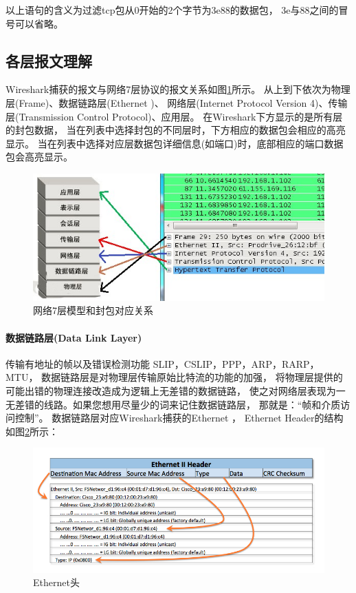 \documentclass{book}
\begin{document}
以上语句的含义为过滤tcp包从0开始的2个字节为3e88的数据包，
3e与88之间的冒号可以省略。

\subsection{各层报文理解}


Wireshark捕获的报文与网络7层协议的报文关系如图\ref{fig:SevenModelInWireshark}所示。
从上到下依次为物理层(Frame)、数据链路层(Ethernet \uppercase\expandafter{})、
网络层(Internet Protocol Version 4)、传输层(Transmission Control Protocol)、应用层。
在Wireshark下方显示的是所有层的封包数据，
当在列表中选择封包的不同层时，下方相应的数据包会相应的高亮显示。
当在列表中选择对应层数据包详细信息(如端口)时，底部相应的端口数据包会高亮显示。

\begin{figure}[htbp]
	\centering
	\includegraphics[scale=0.6]{SevenModelInWireshark.jpg}
	\caption{网络7层模型和封包对应关系}
	\label{fig:SevenModelInWireshark}
\end{figure}

\paragraph{数据链路层(Data Link Layer)}传输有地址的帧以及错误检测功能 SLIP，CSLIP，PPP，ARP，RARP，MTU，
数据链路层是对物理层传输原始比特流的功能的加强，
将物理层提供的可能出错的物理连接改造成为逻辑上无差错的数据链路，
使之对网络层表现为一无差错的线路。如果您想用尽量少的词来记住数据链路层，
那就是：“帧和介质访问控制”。
数据链路层对应Wireshark捕获的Ethernet \uppercase\expandafter{}，
Ethernet \uppercase\expandafter{} Header的结构如图\ref{fig:ethernetheader}所示：

\begin{figure}[htbp]
	\centering
	\includegraphics[scale=0.4]{ethernet-header.jpg}
	\caption{Ethernet头}
	\label{fig:ethernetheader}
\end{figure}
\end{document}
